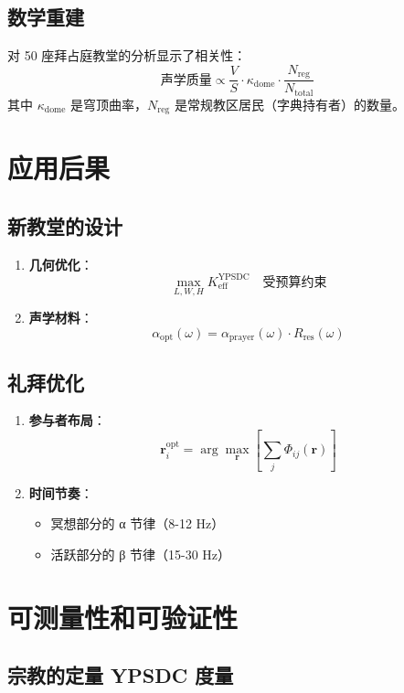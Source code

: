 \documentclass[12pt,a4paper]{article}
\begin{document}
	\subsection{数学重建}
	
	对 50 座拜占庭教堂的分析显示了相关性：
	\[
	\text{声学质量} \propto \frac{V}{S} \cdot \kappa_{\mathrm{dome}} \cdot \frac{N_{\mathrm{reg}}}{N_{\mathrm{total}}}
	\]
	其中 $\kappa_{\mathrm{dome}}$ 是穹顶曲率，$N_{\mathrm{reg}}$ 是常规教区居民（字典持有者）的数量。
	
	\section{应用后果}
	
	\subsection{新教堂的设计}
	
	\begin{enumerate}
		\item \textbf{几何优化}：
		\[
		\max_{L, W, H} K_{\mathrm{eff}}^{\mathrm{YPSDC}} \quad \text{受预算约束}
		\]
		\item \textbf{声学材料}：
		\[
		\alpha_{\mathrm{opt}}(\omega) = \alpha_{\mathrm{prayer}}(\omega) \cdot R_{\mathrm{res}}(\omega)
		\]
	\end{enumerate}
	
	\subsection{礼拜优化}
	
	\begin{enumerate}
		\item \textbf{参与者布局}：
		\[
		\mathbf{r}_i^{\mathrm{opt}} = \arg\max_{\mathbf{r}} \left[\sum_j \Phi_{ij}(\mathbf{r})\right]
		\]
		\item \textbf{时间节奏}：
		\begin{itemize}
			\item 冥想部分的 α 节律（8-12 Hz）
			\item 活跃部分的 β 节律（15-30 Hz）
		\end{itemize}
	\end{enumerate}
	
	\section{可测量性和可验证性}
	
	\subsection{宗教的定量 YPSDC 度量}
	
\end{document}
